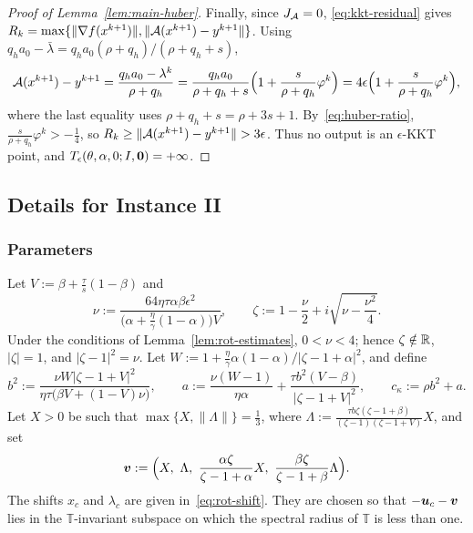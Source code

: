 \begin{proof}[Proof of Lemma~\ref{lem:main-huber}]
Finally, since \(J_{\mathcal{A}}=0\), \eqref{eq:kkt-residual} gives
\(R_k=\max\{\|\nabla f(x^{k+1})\|,\|\mathcal{A}(x^{k+1})-y^{k+1}\|\}\). Using
\(q_ha_0-\bar\lambda=q_ha_0(\rho+q_h)/(\rho+q_h+s)\),
\[
\mathcal{A}(x^{k+1})-y^{k+1}
=\frac{q_ha_0-\lambda^k}{\rho+q_h}
=\frac{q_ha_0}{\rho+q_h+s}\Bigl(1+\frac{s}{\rho+q_h}\varphi^k\Bigr)
=4\epsilon\Bigl(1+\frac{s}{\rho+q_h}\varphi^k\Bigr),
\]
where the last equality uses \(\rho+q_h+s=\rho+3s+1\).
By~\eqref{eq:huber-ratio}, \(\frac{s}{\rho+q_h}\varphi^k>-\frac14\), so
\(R_k\ge\|\calA(x^{k+1})-y^{k+1}\|>3\epsilon\). Thus no output is an
\(\epsilon\)-KKT point, and
\(T_\epsilon(\theta,\alpha,0;I,\bm{0})=+\infty\).
\end{proof}

\subsection{Details for Instance II}
\label{app:lb-rotation}

\subsubsection{Parameters}
\label{app:lb-rotation-params}
Let \(V:=\beta+\frac{\tau}{s}(1-\beta)\) and
\[
\nu:=\frac{64\eta\tau\alpha\beta\epsilon^2}
  {\bigl(\alpha+\frac{\eta}{\gamma}(1-\alpha)\bigr)V},
\qquad
\zeta:=1-\frac{\nu}{2}+i\sqrt{\nu-\frac{\nu^2}{4}} .
\]
Under the conditions of Lemma~\ref{lem:rot-estimates}, \(0<\nu<4\); hence
\(\zeta\notin\mathbb{R}\), \(|\zeta|=1\), and \(|\zeta-1|^2=\nu\). Let
\(W:=1+\frac{\eta}{\gamma}\alpha(1-\alpha)/|\zeta-1+\alpha|^2\), and define
\[
b^2:=\frac{\nu W|\zeta-1+V|^2}{\eta\tau\bigl(\beta V+(1-V)\nu\bigr)},
\qquad
a:=\frac{\nu(W-1)}{\eta\alpha}+\frac{\tau b^2(V-\beta)}{|\zeta-1+V|^2},
\qquad
c_\kappa:=\rho b^2+a.
\]
Let \(X>0\) be such that \(\max\{X,\|\Lambda\|\}=\frac13\), where
\(\Lambda:=\frac{\tau b\zeta(\zeta-1+\beta)}{(\zeta-1)(\zeta-1+V)}X\), and set
\begin{equation}
\bv:=\Bigl(X,\ \Lambda,\ \frac{\alpha\zeta}{\zeta-1+\alpha}X,\
  \frac{\beta\zeta}{\zeta-1+\beta}\Lambda\Bigr).
\label{eq:rot-eigvec}
\end{equation}
The shifts \(x_c\) and \(\lambda_c\) are given in~\eqref{eq:rot-shift}. They
are chosen so that \(-\bm{u}_c-\bm{v}\) lies in the \(\mathbb T\)-invariant subspace
on which the spectral radius of \(\mathbb T\) is less than one.


